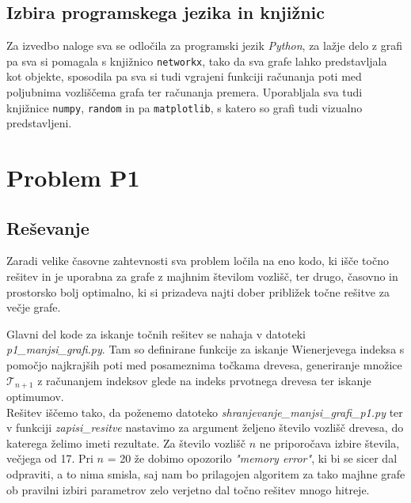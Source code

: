 \documentclass[a4paper, 12 pt]{article}
\begin{document}
\subsection{Izbira programskega jezika in knjižnic}

Za izvedbo naloge sva se odločila za programski jezik \textit{Python}, za lažje delo z grafi pa sva si pomagala s knjižnico \texttt{networkx}, tako da sva grafe lahko predstavljala kot objekte, sposodila pa sva si tudi vgrajeni funkciji računanja poti med poljubnima vozliščema grafa ter računanja premera. Uporabljala sva tudi knjižnice \texttt{numpy}, \texttt{random} in pa \texttt{matplotlib}, s katero so grafi tudi vizualno predstavljeni.



\pagebreak

\section{Problem P1}

\subsection{Reševanje}

Zaradi velike časovne zahtevnosti sva problem ločila na eno kodo, ki išče točno rešitev in je uporabna za grafe z majhnim številom vozlišč, ter drugo, časovno in prostorsko bolj optimalno, ki si prizadeva najti dober približek točne rešitve za večje grafe.
\vspace{0.5cm}

Glavni del kode za iskanje točnih rešitev se nahaja v datoteki \textit{p1\_manjsi\_grafi.py}. Tam so definirane funkcije za iskanje Wienerjevega indeksa s pomočjo najkrajših poti med posameznima točkama drevesa, generiranje množice $\mathscr{T}_{n+1}$  z računanjem indeksov glede na indeks prvotnega drevesa ter iskanje optimumov. \\

Rešitev iščemo tako, da poženemo datoteko \textit{shranjevanje\_manjsi\_grafi\_p1.py} ter v funkciji \textit{zapisi\_resitve} nastavimo za argument željeno število vozlišč drevesa, do katerega želimo imeti rezultate. Za število vozlišč $n$ ne priporočava izbire števila, večjega od 17. Pri $n$ = 20 že dobimo opozorilo \textit{"memory error"}, ki bi se sicer dal odpraviti, a to nima smisla, saj nam bo prilagojen algoritem za tako majhne grafe ob pravilni izbiri parametrov zelo verjetno dal točno rešitev mnogo hitreje.
\vspace{0.5cm}
\end{document}
